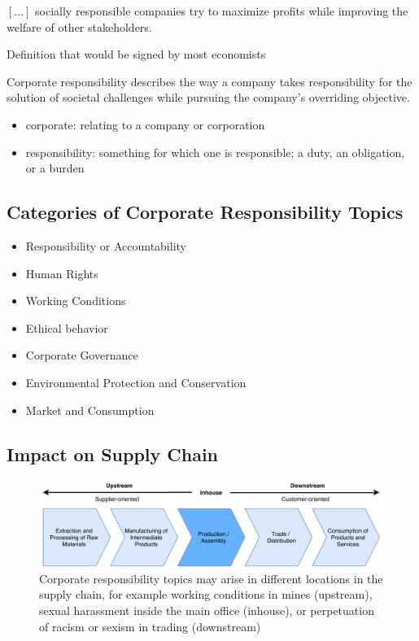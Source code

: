 \documentclass[11pt]{article}
\theoremstyle{definition}
\begin{document}
\begin{definition}
	$[...]$ socially responsible companies try to maximize profits while improving the welfare of other stakeholders.
\end{definition}

\vspace*{1em}
\noindent
Definition that would be signed by most economists
\begin{definition}
	Corporate responsibility describes the way a company takes responsibility for the solution of societal challenges while pursuing the company’s overriding objective.
	\begin{itemize}
		\item corporate: relating to a company or corporation
		\item responsibility: something for which one is responsible; a duty, an obligation, or a burden
	\end{itemize}
\end{definition}

\subsection{Categories of Corporate Responsibility Topics}
\begin{itemize}
	\item Responsibility or Accountability
	\item Human Rights
	\item Working Conditions
	\item Ethical behavior
	\item Corporate Governance
	\item Environmental Protection and Conservation
	\item Market and Consumption
\end{itemize}

\subsection{Impact on Supply Chain}

\begin{figure}[H]
	\centering
	\includegraphics[width=0.85\linewidth]{img/corporate_responsibility_stages.pdf}
	\caption{Corporate responsibility topics may arise in different locations in the supply chain, for example working conditions in mines (upstream), sexual harassment inside the main office (inhouse), or perpetuation of racism or sexism in trading (downstream)}
\end{figure}
\end{document}
